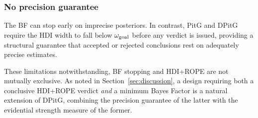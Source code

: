 \subsubsection*{No precision guarantee}

The BF can stop early on imprecise posteriors.  In contrast, PitG and DPitG require
the HDI width to fall below $\omega_{\rm goal}$ before any verdict is issued, providing
a structural guarantee that accepted or rejected conclusions rest on adequately precise
estimates.

These limitations notwithstanding, BF stopping and HDI+ROPE are not mutually exclusive.
As noted in Section~\ref{sec:discussion}, a design requiring both a conclusive
HDI+ROPE verdict \textit{and} a minimum Bayes Factor is a natural extension of DPitG,
combining the precision guarantee of the latter with the evidential strength measure
of the former.
